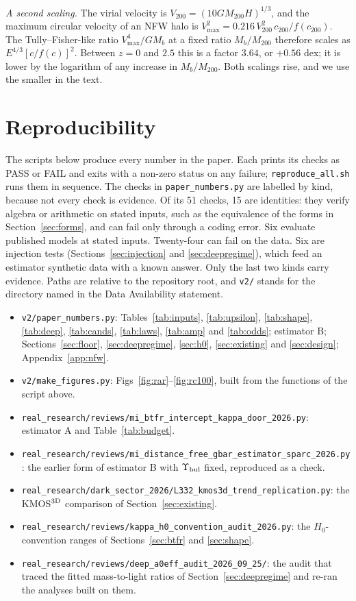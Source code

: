 \documentclass[fleqn,usenatbib]{mnras}
\begin{document}
\emph{A second scaling.} The virial velocity is $V_{200}=(10GM_{200}H)^{1/3}$, and the maximum circular velocity of an NFW halo is $V_{\max}^2=0.216\,V_{200}^2\,c_{200}/f(c_{200})$. The Tully--Fisher-like ratio $V_{\max}^4/GM_b$ at a fixed ratio $M_b/M_{200}$ therefore scales as $E^{4/3}[c/f(c)]^2$. Between $z=0$ and $2.5$ this is a factor $3.64$, or $+0.56$ dex; it is lower by the logarithm of any increase in $M_b/M_{200}$. Both scalings rise, and we use the smaller in the text.

\section{Reproducibility}
\label{app:repro}
The scripts below produce every number in the paper. Each prints its checks as PASS or FAIL and exits with a non-zero status on any failure; \texttt{reproduce\_all.sh} runs them in sequence. The checks in \texttt{paper\_numbers.py} are labelled by kind, because not every check is evidence. Of its 51 checks, 15 are identities: they verify algebra or arithmetic on stated inputs, such as the equivalence of the forms in Section~\ref{sec:forms}, and can fail only through a coding error. Six evaluate published models at stated inputs. Twenty-four can fail on the data. Six are injection tests (Sections~\ref{sec:injection} and \ref{sec:deepregime}), which feed an estimator synthetic data with a known answer. Only the last two kinds carry evidence. Paths are relative to the repository root, and \texttt{v2/} stands for the directory named in the Data Availability statement.
\begin{itemize}
\item \nolinkurl{v2/paper_numbers.py}: Tables~\ref{tab:inputs}, \ref{tab:upsilon}, \ref{tab:shape}, \ref{tab:deep}, \ref{tab:cands}, \ref{tab:laws}, \ref{tab:amp} and \ref{tab:odds}; estimator B; Sections~\ref{sec:floor}, \ref{sec:deepregime}, \ref{sec:h0}, \ref{sec:existing} and \ref{sec:design}; Appendix~\ref{app:nfw}.
\item \nolinkurl{v2/make_figures.py}: Figs~\ref{fig:rar}--\ref{fig:rc100}, built from the functions of the script above.
\item \nolinkurl{real_research/reviews/mi_btfr_intercept_kappa_door_2026.py}: estimator A and Table~\ref{tab:budget}.
\item \nolinkurl{real_research/reviews/mi_distance_free_gbar_estimator_sparc_2026.py}: the earlier form of estimator B with $\Upsilon_{\rm bul}$ fixed, reproduced as a check.
\item \nolinkurl{real_research/dark_sector_2026/L332_kmos3d_trend_replication.py}: the KMOS$^{\rm 3D}$ comparison of Section~\ref{sec:existing}.
\item \nolinkurl{real_research/reviews/kappa_h0_convention_audit_2026.py}: the $H_0$-convention ranges of Sections~\ref{sec:btfr} and \ref{sec:shape}.
\item \nolinkurl{real_research/reviews/deep_a0eff_audit_2026_09_25/}: the audit that traced the fitted mass-to-light ratios of Section~\ref{sec:deepregime} and re-ran the analyses built on them.
\end{itemize}

\bsp
\label{lastpage}
\end{document}

